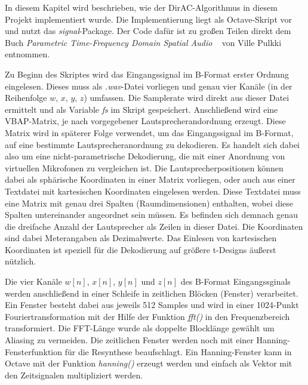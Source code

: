 In diesem Kapitel wird beschrieben, wie der DirAC-Algorithmus in diesem Projekt implementiert wurde. Die Implementierung liegt als Octave-Skript vor und nutzt das \textit{signal}-Package. Der Code dafür ist zu großen Teilen direkt dem Buch \textit{Parametric Time-Frequency Domain Spatial Audio} ~\cite{spatial-book} von Ville Pulkki entnommen.

Zu Beginn des Skriptes wird das Eingangssignal im B-Format erster Ordnung eingelesen. Dieses muss als \textit{.wav}-Datei vorliegen und genau vier Kanäle (in der Reihenfolge $w$, $x$, $y$, $z$) umfassen. Die Samplerate wird direkt aus dieser Datei ermittelt und als Variable \textit{fs} im Skript gespeichert. Anschließend wird eine VBAP-Matrix, je nach vorgegebener Lautsprecherandordnung erzeugt. Diese Matrix wird in späterer Folge verwendet, um das Eingangssignal im B-Format, auf eine bestimmte Lautsprecheranordnung zu dekodieren. Es handelt sich dabei also um eine nicht-parametrische Dekodierung, die mit einer Anordnung von virtuellen Mikrofonen zu vergleichen ist. Die Lautsprecherpositionen können dabei als sphärische Koordinaten in einer Matrix vorliegen, oder auch aus einer Textdatei mit kartesischen Koordinaten eingelesen werden. Diese Textdatei muss eine Matrix mit genau drei Spalten (Raumdimensionen) enthalten, wobei diese Spalten untereinander angeordnet sein müssen. Es befinden sich demnach genau die dreifache Anzahl der Lautsprecher als Zeilen in dieser Datei. Die Koordinaten sind dabei Meterangaben als Dezimalwerte. Das Einlesen von kartesischen Koordinaten ist speziell für die Dekodierung auf größere t-Designs äußerst nützlich.

Die vier Kanäle $w[n]$, $x[n]$, $y[n]$ und $z[n]$ des B-Format Eingangssginals werden anschließend in einer Schleife in zeitlichen Blöcken (Fenster) verarbeitet. Ein Fenster besteht dabei aus jeweils 512 Samples und wird in einer 1024-Punkt Fouriertransformation mit der Hilfe der Funktion \textit{fft()} in den Frequenzbereich transformiert. Die FFT-Länge wurde als doppelte Blocklänge gewählt um Aliasing zu vermeiden. Die zeitlichen Fenster werden noch mit einer Hanning-Fensterfunktion für die Resynthese beaufschlagt. Ein Hanning-Fenster kann in Octave mit der Funktion \textit{hanning()} erzeugt werden und einfach als Vektor mit den Zeitsignalen multipliziert werden.
